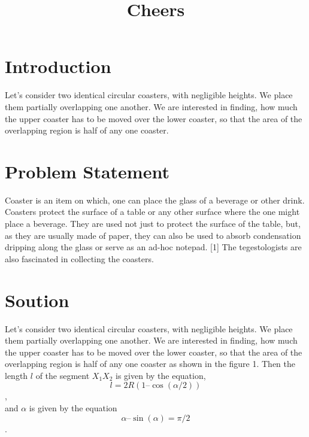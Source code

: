 \documentclass[11pt]{article}
\begin{document}
\tableofcontents
	
\title{Cheers}

\newpage
\section{Introduction}
	Let’s consider two identical circular coasters, with negligible heights. We place them partially overlapping one another. We are interested in finding, how much the upper coaster has to be moved over the lower coaster, so that the area of the overlapping region is half of any one coaster.
		
\section{Problem Statement}
	Coaster is an item on which, one can place the glass of a beverage or other drink. Coasters protect the surface of a table or any other surface where the one might place a beverage. They are used not just to protect the surface of the table, but, as they are usually made of paper, they can also be used to absorb condensation dripping along the glass or serve as an ad-hoc notepad. [1] The tegestologists are also fascinated in collecting the coasters. 
	
\section{Soution}
	Let’s consider two identical circular coasters, with negligible heights. We place them partially overlapping one another. We are interested in finding, how much the upper coaster has to be moved over the lower coaster, so that the area of the overlapping region is half of any one coaster as shown in the figure 1.
	Then the length $l$ of the segment $X_1X_2$ is given by the equation,\\
	
	 $$l = 2R(1 – \cos(\alpha/2))$$,\\
	
	and $\alpha$ is given by the equation\\
	
	 $$\alpha – \sin(\alpha) = \pi/2$$.
	
\end{document}
